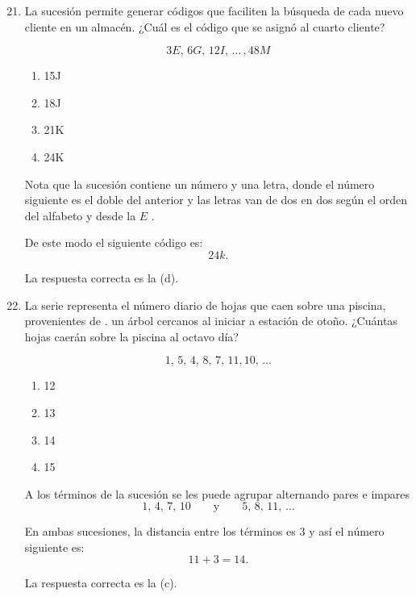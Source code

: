\documentclass[11pt, a4paper]{article} %
\theoremstyle{dotlessP}
\theoremstyle{dotlessS}
\begin{document}
\begin{enumerate}[label=\color{dg}\theenumi.]
        \setcounter{enumi}{20}
        \normalsize
        \item {\color{db}La sucesión permite generar códigos que faciliten la búsqueda de cada nuevo cliente en un almacén. ¿Cuál es el código que se asignó al cuarto cliente?
        
        \[
       	 3E,\, 6G,\, 12I, \,\dots\, , 48M
        \]
       \begin{enumerate}
       		\item 15J
       		\item 18J
       		\item 21K
       		\item 24K
       \end{enumerate}
}
Nota que la sucesión contiene un número y una letra, donde el número siguiente es el doble del anterior y las letras van de dos en dos según el orden del alfabeto y desde la \(	E\) .

De este modo el siguiente código es: 
\[
	24k.
\]

   {\color{dh} La respuesta correcta es la (d).}
   
   
\item {\color{db}La serie representa el número diario de hojas que caen sobre una piscina, provenientes de . un árbol cercanos al iniciar a estación de otoño. ¿Cuántas hojas caerán sobre la piscina al octavo día?
        
        \[
      	  1,\, 5,\, 4, \,8,\,7,\,11, 10,\, \dots 
        \]
         \begin{enumerate}
       		\item 12
       		\item 13
       		\item 14
       		\item 15
       \end{enumerate}
}   

A los términos de la sucesión se les puede agrupar alternando pares e impares
\[
	1,\,4, \,7,\,10 \qquad \text{y}\qquad 5,\, 8 , \, 11, \, \dots
\]

En ambas sucesiones, la distancia entre los términos es \(3\) y así el número siguiente es:
\[
	11 + 3 = 14.
\]


   {\color{dh} La respuesta correcta es la (c).}
   

\end{enumerate}
\end{document}
